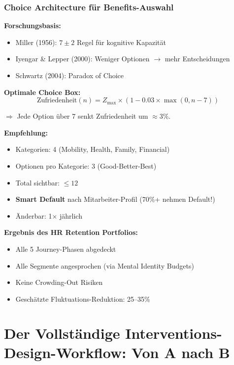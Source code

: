 \subsubsection{Choice Architecture für Benefits-Auswahl}

\textbf{Forschungsbasis:}
\begin{itemize}[nosep]
\item Miller (1956): $7 \pm 2$ Regel für kognitive Kapazität
\item Iyengar \& Lepper (2000): Weniger Optionen $\rightarrow$ mehr Entscheidungen
\item Schwartz (2004): Paradox of Choice
\end{itemize}

\textbf{Optimale Choice Box:}
\begin{equation}
\text{Zufriedenheit}(n) = Z_{\max} \times (1 - 0.03 \times \max(0, n-7))
\end{equation}

$\Rightarrow$ Jede Option über 7 senkt Zufriedenheit um $\approx 3\%$.

\begin{tcolorbox}[colback=green!5!white, colframe=green!75!black]
\textbf{Empfehlung:}
\begin{itemize}[nosep]
\item Kategorien: 4 (Mobility, Health, Family, Financial)
\item Optionen pro Kategorie: 3 (Good-Better-Best)
\item Total sichtbar: $\leq 12$
\item \textbf{Smart Default} nach Mitarbeiter-Profil (70\%+ nehmen Default!)
\item Änderbar: 1$\times$ jährlich
\end{itemize}
\end{tcolorbox}

\textbf{Ergebnis des HR Retention Portfolios:}
\begin{itemize}[nosep]
\item Alle 5 Journey-Phasen abgedeckt
\item Alle Segmente angesprochen (via Mental Identity Budgets)
\item Keine Crowding-Out Risiken
\item Geschätzte Fluktuations-Reduktion: 25--35\%
\end{itemize}


\section{Der Vollständige Interventions-Design-Workflow: Von A nach B}
\label{sec:20-workflow}

